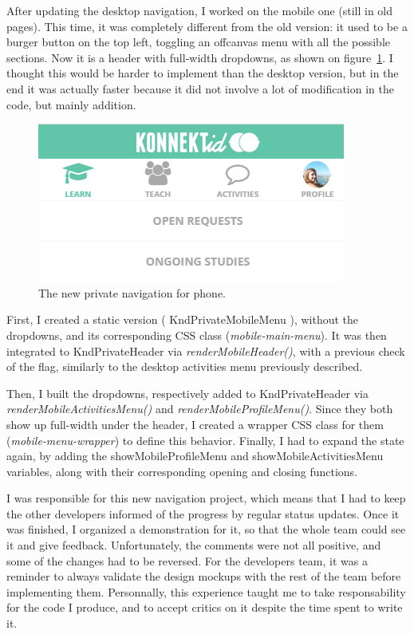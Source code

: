 After updating the desktop navigation, I worked on the mobile one (still in old pages). This time, it was completely different from the old version: it used to be a burger button on the top left, toggling an offcanvas menu with all the possible sections. Now it is a header with full-width dropdowns, as shown on {\sc figure}~\ref{fig:newNavPhone}. I thought this would be harder to implement than the desktop version, but in the end it was actually faster because it did not involve a lot of modification in the code, but mainly addition.

\begin{figure}[H]
    \centering
    \includegraphics{figure/newNavPhone.png}
    \caption{The new private navigation for phone.}
    \label{fig:newNavPhone}
\end{figure}

First, I created a static version (\guillemotleft{} KndPrivateMobileMenu \guillemotright{}), without the dropdowns, and its corresponding CSS class (\textit{mobile-main-menu}). It was then integrated to KndPrivateHeader via \textit{renderMobileHeader()}, with a previous check of the flag, similarly to the desktop activities menu previously described.

Then, I built the dropdowns, respectively added to KndPrivateHeader via \textit{renderMobileActivitiesMenu()} and \textit{renderMobileProfileMenu()}. Since they both show up full-width under the header, I created a wrapper CSS class for them (\textit{mobile-menu-wrapper}) to define this behavior. Finally, I had to expand the state again, by adding the \guillemotleft{} showMobileProfileMenu \guillemotright{} and \guillemotleft{} showMobileActivitiesMenu \guillemotright{} variables, along with their corresponding opening and closing functions. 

I was responsible for this new navigation project, which means that I had to keep the other developers informed of the progress by regular status updates. Once it was finished, I organized a demonstration for it, so that the whole team could see it and give feedback. Unfortunately, the comments were not all positive, and some of the changes had to be reversed. For the developers team, it was a reminder to always validate the design mockups with the rest of the team before implementing them. Personnally, this experience taught me to take responsability for the code I produce, and to accept critics on it despite the time spent to write it.


